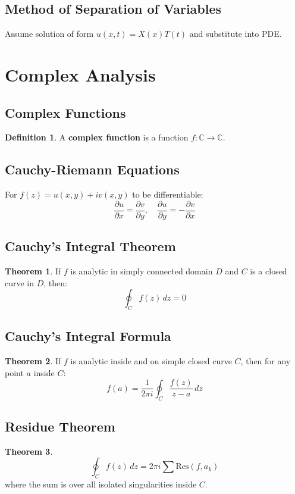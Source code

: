 \documentclass[11pt]{article}
\theoremstyle{definition}
\newtheorem{definition}{Definition}[section]
\newtheorem{theorem}{Theorem}[section]
\begin{document}
\subsection{Method of Separation of Variables}
Assume solution of form $u(x,t) = X(x)T(t)$ and substitute into PDE.

\section{Complex Analysis}

\subsection{Complex Functions}
\begin{definition}
A \textbf{complex function} is a function $f: \mathbb{C} \to \mathbb{C}$.
\end{definition}

\subsection{Cauchy-Riemann Equations}
For $f(z) = u(x,y) + iv(x,y)$ to be differentiable:
$$\frac{\partial u}{\partial x} = \frac{\partial v}{\partial y}, \quad \frac{\partial u}{\partial y} = -\frac{\partial v}{\partial x}$$

\subsection{Cauchy's Integral Theorem}
\begin{theorem}
If $f$ is analytic in simply connected domain $D$ and $C$ is a closed curve in $D$, then:
$$\oint_C f(z) \, dz = 0$$
\end{theorem}

\subsection{Cauchy's Integral Formula}
\begin{theorem}
If $f$ is analytic inside and on simple closed curve $C$, then for any point $a$ inside $C$:
$$f(a) = \frac{1}{2\pi i} \oint_C \frac{f(z)}{z-a} \, dz$$
\end{theorem}

\subsection{Residue Theorem}
\begin{theorem}
$$\oint_C f(z) \, dz = 2\pi i \sum \text{Res}(f, a_k)$$
where the sum is over all isolated singularities inside $C$.
\end{theorem}
\end{document}
